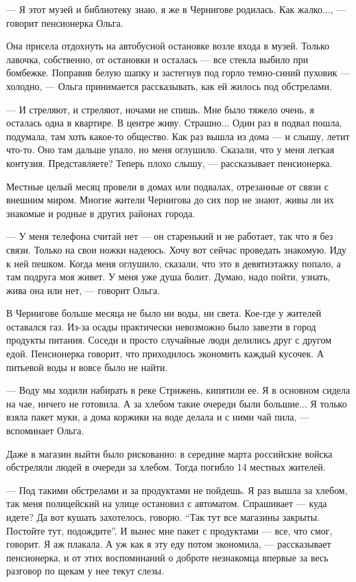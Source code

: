 — Я этот музей и библиотеку знаю, я же в Чернигове родилась. Как жалко..., —
говорит пенсионерка Ольга. 

Она присела отдохнуть на автобусной остановке возле входа в музей. Только
лавочка, собственно, от остановки и осталась — все стекла выбило при бомбежке.
Поправив белую шапку и застегнув под горло темно-синий пуховик — холодно, —
Ольга принимается рассказывать, как ей жилось под обстрелами. 

— И стреляют, и стреляют, ночами не спишь. Мне было тяжело очень, я осталась
одна в квартире. В центре живу. Страшно... Один раз в подвал пошла, подумала, там
хоть какое-то общество. Как раз вышла из дома — и слышу, летит что-то. Оно там
дальше упало, но меня оглушило. Сказали, что у меня легкая контузия.
Представляете? Теперь плохо слышу, — рассказывает пенсионерка. 

Местные целый месяц провели в домах или подвалах, отрезанные от связи с внешним
миром. Многие жители Чернигова до сих пор не знают, живы ли их знакомые и
родные в других районах города. 

— У меня телефона считай нет — он старенький и не работает, так что я без
связи. Только на свои ножки надеюсь. Хочу вот сейчас проведать знакомую. Иду к
ней пешком. Когда меня оглушило, сказали, что это в девятиэтажку попало, а там
подруга моя живет. У меня уже душа болит. Думаю, надо пойти, узнать, жива она
или нет, — говорит Ольга.

В Чернигове больше месяца не было ни воды, ни света. Кое-где у жителей
оставался газ. Из-за осады практически невозможно было завезти в город продукты
питания. Соседи и просто случайные люди делились друг с другом едой.
Пенсионерка говорит, что приходилось экономить каждый кусочек. А питьевой воды
и вовсе было не найти. 

— Воду мы ходили набирать в реке Стрижень, кипятили ее. Я в основном сидела на
чае, ничего не готовила. А за хлебом такие очереди были большие... Я только взяла
пакет муки, а дома коржики на воде делала и с ними чай пила, — вспоминает
Ольга. 

Даже в магазин выйти было рискованно: в середине марта российские войска
обстреляли людей в очереди за хлебом. Тогда погибло 14 местных жителей. 

— Под такими обстрелами и за продуктами не пойдешь. Я раз вышла за хлебом, так
меня полицейский на улице остановил с автоматом. Спрашивает — куда идете? Да
вот кушать захотелось, говорю. \enquote{Так тут все магазины закрыты. Постойте тут,
подождите}. И вынес мне пакет с продуктами — все, что смог, говорит. Я аж
плакала. А уж как я эту еду потом экономила, — рассказывает пенсионерка, и от
этих воспоминаний о доброте незнакомца впервые за весь разговор по щекам у нее
текут слезы.


